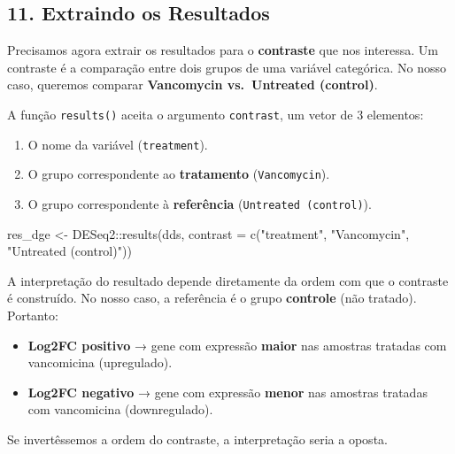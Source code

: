 \documentclass[
  letterpaper,
  DIV=11,
  numbers=noendperiod]{scrreprt}
\newenvironment{Shaded}{\begin{snugshade}}{\end{snugshade}}
\newcommand{\AttributeTok}[1]{\textcolor[rgb]{0.40,0.45,0.13}{#1}}
\newcommand{\FunctionTok}[1]{\textcolor[rgb]{0.28,0.35,0.67}{#1}}
\newcommand{\NormalTok}[1]{\textcolor[rgb]{0.00,0.23,0.31}{#1}}
\newcommand{\OtherTok}[1]{\textcolor[rgb]{0.00,0.23,0.31}{#1}}
\newcommand{\SpecialCharTok}[1]{\textcolor[rgb]{0.37,0.37,0.37}{#1}}
\newcommand{\StringTok}[1]{\textcolor[rgb]{0.13,0.47,0.30}{#1}}
\providecommand{\tightlist}{%
  \setlength{\itemsep}{0pt}\setlength{\parskip}{0pt}}
\begin{document}
\subsection{11. Extraindo os Resultados}\label{extraindo-os-resultados}

Precisamos agora extrair os resultados para o \textbf{contraste} que nos
interessa. Um contraste é a comparação entre dois grupos de uma variável
categórica. No nosso caso, queremos comparar \textbf{Vancomycin
vs.~Untreated (control)}.

A função \texttt{results()} aceita o argumento \texttt{contrast}, um
vetor de 3 elementos:

\begin{enumerate}
\def\labelenumi{\arabic{enumi}.}
\tightlist
\item
  O nome da variável (\texttt{treatment}).
\item
  O grupo correspondente ao \textbf{tratamento} (\texttt{Vancomycin}).
\item
  O grupo correspondente à \textbf{referência}
  (\texttt{Untreated\ (control)}).
\end{enumerate}

\begin{Shaded}
\begin{Highlighting}[]
\NormalTok{res\_dge }\OtherTok{\textless{}{-}}\NormalTok{ DESeq2}\SpecialCharTok{::}\FunctionTok{results}\NormalTok{(dds, }
                           \AttributeTok{contrast =} \FunctionTok{c}\NormalTok{(}\StringTok{"treatment"}\NormalTok{, }\StringTok{"Vancomycin"}\NormalTok{, }\StringTok{"Untreated (control)"}\NormalTok{))}
\end{Highlighting}
\end{Shaded}

\begin{tcolorbox}[enhanced jigsaw, arc=.35mm, bottomrule=.15mm, bottomtitle=1mm, breakable, colback=white, colbacktitle=quarto-callout-important-color!10!white, colframe=quarto-callout-important-color-frame, coltitle=black, left=2mm, leftrule=.75mm, opacityback=0, opacitybacktitle=0.6, rightrule=.15mm, title=\textcolor{quarto-callout-important-color}{\faExclamation}\hspace{0.5em}{A Ordem do Contraste Importa!}, titlerule=0mm, toprule=.15mm, toptitle=1mm]

A interpretação do resultado depende diretamente da ordem com que o
contraste é construído. No nosso caso, a referência é o grupo
\textbf{controle} (não tratado). Portanto:

\begin{itemize}
\tightlist
\item
  \textbf{Log2FC positivo} → gene com expressão \textbf{maior} nas
  amostras tratadas com vancomicina (upregulado).
\item
  \textbf{Log2FC negativo} → gene com expressão \textbf{menor} nas
  amostras tratadas com vancomicina (downregulado).
\end{itemize}

Se invertêssemos a ordem do contraste, a interpretação seria a oposta.

\end{tcolorbox}
\end{document}
